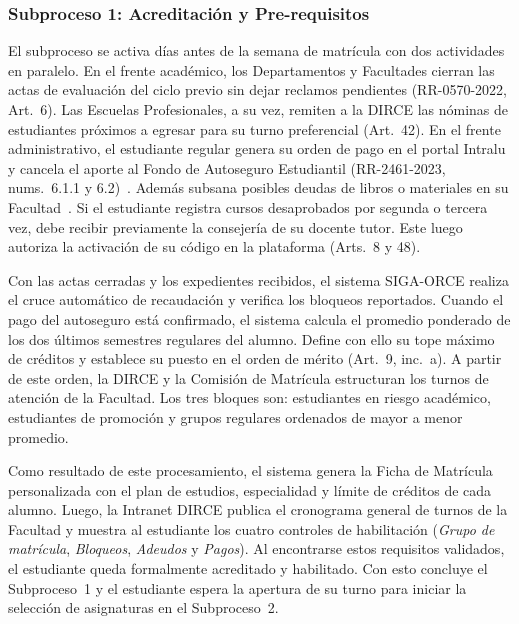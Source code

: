 \subsubsection{Subproceso 1: Acreditaci\'on y Pre-requisitos}

El subproceso se activa d\'ias antes de la semana de matr\'icula con dos actividades en paralelo. En el frente acad\'emico, los Departamentos y Facultades cierran las actas de evaluaci\'on del ciclo previo sin dejar reclamos pendientes (RR-0570-2022, Art.~6\textdegree{}). Las Escuelas Profesionales, a su vez, remiten a la DIRCE las n\'ominas de estudiantes pr\'oximos a egresar para su turno preferencial (Art.~42\textdegree{}). En el frente administrativo, el estudiante regular genera su orden de pago en el portal Intralu y cancela el aporte al Fondo de Autoseguro Estudiantil (RR-2461-2023, nums.~6.1.1 y 6.2)~\cite{autoseguro2023}. Adem\'as subsana posibles deudas de libros o materiales en su Facultad~\cite{tupa2024}. Si el estudiante registra cursos desaprobados por segunda o tercera vez, debe recibir previamente la consejer\'ia de su docente tutor. Este luego autoriza la activaci\'on de su c\'odigo en la plataforma (Arts.~8\textdegree{} y 48\textdegree{}).

Con las actas cerradas y los expedientes recibidos, el sistema SIGA-ORCE realiza el cruce autom\'atico de recaudaci\'on y verifica los bloqueos reportados. Cuando el pago del autoseguro est\'a confirmado, el sistema calcula el promedio ponderado de los dos \'ultimos semestres regulares del alumno. Define con ello su tope m\'aximo de cr\'editos y establece su puesto en el orden de m\'erito (Art.~9\textdegree{}, inc.~a). A partir de este orden, la DIRCE y la Comisi\'on de Matr\'icula estructuran los turnos de atenci\'on de la Facultad. Los tres bloques son: estudiantes en riesgo acad\'emico, estudiantes de promoci\'on y grupos regulares ordenados de mayor a menor promedio.

Como resultado de este procesamiento, el sistema genera la Ficha de Matr\'icula personalizada con el plan de estudios, especialidad y l\'imite de cr\'editos de cada alumno. Luego, la Intranet DIRCE publica el cronograma general de turnos de la Facultad y muestra al estudiante los cuatro controles de habilitaci\'on (\textit{Grupo de matr\'icula}, \textit{Bloqueos}, \textit{Adeudos} y \textit{Pagos}). Al encontrarse estos requisitos validados, el estudiante queda formalmente acreditado y habilitado. Con esto concluye el Subproceso~1 y el estudiante espera la apertura de su turno para iniciar la selecci\'on de asignaturas en el Subproceso~2.

